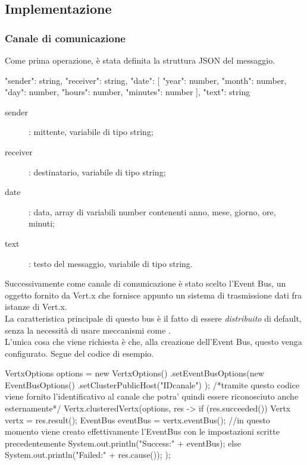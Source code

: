     \subsection{Implementazione}
      \subsubsection*{Canale di comunicazione}
        Come prima operazione, è stata definita la struttura JSON del messaggio.
        \begin{codice_json}[]
          {
            "sender": string,
            "receiver": string,
            "date": [
              {
                "year": number,
                "month": number,
                "day": number,
                "hours": number,
                "minutes": number
              }
            ],
            "text": string
          }
        \end{codice_json}
        \begin{description}
          \item[sender]: mittente, variabile di tipo string;
          \item[receiver]: destinatario, variabile di tipo string;
          \item[date]: data, array di variabili number contenenti anno, mese, giorno, ore, minuti;
          \item[text]: testo del messaggio, variabile di tipo string.
        \end{description}
        Successivamente come canale di comunicazione è stato scelto l'Event Bus, un oggetto fornito da Vert.x che fornisce appunto un sistema di trasmissione dati fra istanze di Vert.x.\\
        La caratteristica principale di questo bus è il fatto di essere \textit{distribuito} di default, senza la necessità di usare meccanismi come .\\
        L'unica cosa che viene richiesta è che, alla creazione dell'Event Bus, questo venga configurato. Segue del codice di esempio.
        \begin{codice_java}
          VertxOptions options = new VertxOptions()
            .setEventBusOptions(new EventBusOptions()
            .setClusterPublicHost("IDcanale")
            ); /*tramite questo codice viene fornito l'identificativo al canale che potra' quindi essere riconosciuto anche esternamente*/
            Vertx.clusteredVertx(options, res -> {
              if (res.succeeded()) {
                Vertx vertx = res.result();
                EventBus eventBus = vertx.eventBus(); //in questo momento viene creato effettivamente l'EventBus con le impostazioni scritte precedentemente
                System.out.println("Success:" + eventBus);
              }
              else {
                System.out.println("Failed:" + res.cause());
              }
            });
        \end{codice_java}
